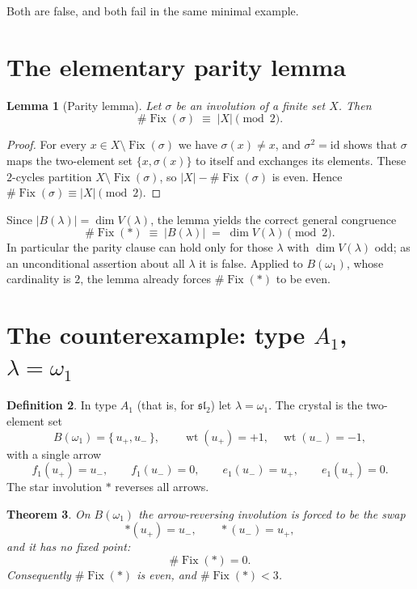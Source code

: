 \documentclass[11pt]{article}
\newtheorem{theorem}{Theorem}
\newtheorem{lemma}[theorem]{Lemma}
\theoremstyle{definition}
\newtheorem{definition}[theorem]{Definition}
\theoremstyle{remark}
\newcommand{\Fix}{\operatorname{Fix}}
\newcommand{\wt}{\operatorname{wt}}
\begin{document}
Both are false, and both fail in the same minimal example.

\section{The elementary parity lemma}

\begin{lemma}[Parity lemma]\label{lem:parity}
Let $\sigma$ be an involution of a finite set $X$. Then
\[
\#\Fix(\sigma) \;\equiv\; |X| \pmod 2 .
\]
\end{lemma}

\begin{proof}
For every $x \in X \setminus \Fix(\sigma)$ we have $\sigma(x) \ne x$, and
$\sigma^2 = \mathrm{id}$ shows that $\sigma$ maps the two-element set
$\{x, \sigma(x)\}$ to itself and exchanges its elements. These $2$-cycles
partition $X \setminus \Fix(\sigma)$, so $|X| - \#\Fix(\sigma)$ is even. Hence
$\#\Fix(\sigma) \equiv |X| \pmod 2$.
\end{proof}

Since $|B(\lambda)| = \dim V(\lambda)$, the lemma yields the correct general
congruence
\begin{equation}\label{eq:general}
\#\Fix(*) \;\equiv\; |B(\lambda)| \;=\; \dim V(\lambda) \pmod 2 .
\end{equation}
In particular the parity clause can hold only for those $\lambda$ with
$\dim V(\lambda)$ odd; as an unconditional assertion about all $\lambda$ it is
false. Applied to $B(\omega_1)$, whose cardinality is $2$, the lemma already
forces $\#\Fix(*)$ to be even.

\section{The counterexample: type $A_1$, $\lambda = \omega_1$}

\begin{definition}
In type $A_1$ (that is, for $\mathfrak{sl}_2$) let $\lambda = \omega_1$. The
crystal is the two-element set
\[
B(\omega_1) = \{\,u_+, u_-\,\}, \qquad
\wt(u_+) = +1, \quad \wt(u_-) = -1,
\]
with a single arrow
\[
f_1(u_+) = u_-, \qquad f_1(u_-) = 0, \qquad
e_1(u_-) = u_+, \qquad e_1(u_+) = 0 .
\]
The star involution $*$ reverses all arrows.
\end{definition}

\begin{theorem}\label{thm:counterexample}
On $B(\omega_1)$ the arrow-reversing involution is forced to be the swap
\[
*(u_+) = u_-, \qquad *(u_-) = u_+,
\]
and it has no fixed point:
\[
\#\Fix(*) = 0 .
\]
Consequently $\#\Fix(*)$ is even, and $\#\Fix(*) < 3$.
\end{theorem}
\end{document}

